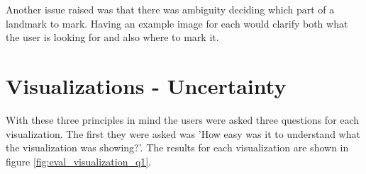 Another issue raised was that there was ambiguity deciding which part of a landmark to mark. Having an example image for each would clarify both what the user is looking for and also where to mark it.


\newpage
\section{Visualizations - Uncertainty}
With these three principles in mind the users were asked three questions for each visualization. The first they were asked was 'How easy was it to understand what the visualization was showing?'. The results for each visualization are shown in figure \ref{fig:eval_visualization_q1}.

